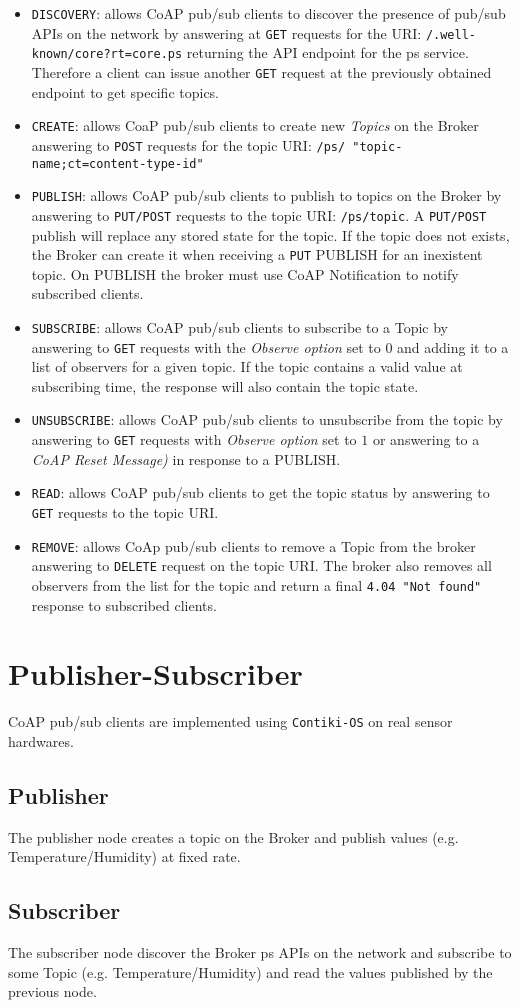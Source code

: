 \documentclass[a4paper]{article}
\begin{document}
\begin{itemize}
	\item \texttt{DISCOVERY}: allows CoAP pub/sub clients to discover the presence of pub/sub APIs on the network by answering at \texttt{GET} requests for the URI: \texttt{/.well-known/core?rt=core.ps} returning the API endpoint for the ps service. Therefore a client can issue another \texttt{GET} request at the previously obtained endpoint to get specific topics.
	\item \texttt{CREATE}: allows CoaP pub/sub clients to create new \textit{Topics} on the Broker answering to \texttt{POST} requests for the topic URI: \texttt{/ps/ "topic-name;ct=content-type-id"}
	\item \texttt{PUBLISH}: allows CoAP pub/sub clients to publish to topics on the Broker by answering to \texttt{PUT/POST} requests to the topic URI: \texttt{/ps/topic}. A \texttt{PUT/POST} publish will replace any stored state for the topic. If the topic does not exists, the Broker can create it when receiving a \texttt{PUT} PUBLISH for an  inexistent topic. On PUBLISH the broker must use CoAP Notification to notify subscribed clients.
	\item \texttt{SUBSCRIBE}: allows CoAP pub/sub clients to subscribe to a Topic by answering to \texttt{GET} requests with the \textit{Observe option} set to $0$ and adding it to a list of observers for a given topic. If the topic contains a valid value at subscribing time, the response will also contain the topic state.
	\item \texttt{UNSUBSCRIBE}: allows CoAP pub/sub clients to unsubscribe from the topic by answering to \texttt{GET} requests with \textit{Observe option} set to $1$ or answering to a \textit{CoAP Reset Message)} in response to a PUBLISH.
	\item \texttt{READ}: allows CoAP pub/sub clients to get the topic status by answering to \texttt{GET} requests to the topic URI.
	\item \texttt{REMOVE}: allows CoAp pub/sub clients to remove a Topic from the broker answering to \texttt{DELETE} request on the topic URI. The broker also removes all observers from the list for the topic and return a final \texttt{4.04 "Not found"} response to subscribed clients.
\end{itemize}
\section{Publisher-Subscriber}
CoAP pub/sub clients are implemented using \texttt{Contiki-OS} on real sensor hardwares.
\subsection{Publisher}
The publisher node creates a topic on the Broker and publish values (e.g. Temperature/Humidity) at fixed rate.
\subsection{Subscriber}
The subscriber node discover the Broker ps APIs on the network and subscribe to some Topic (e.g. Temperature/Humidity) and read the values published by the previous node.
\end{document}
